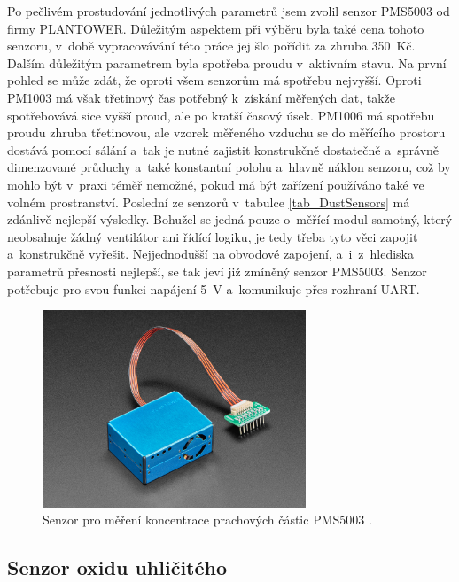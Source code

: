 Po pečlivém prostudování jednotlivých parametrů jsem zvolil senzor PMS5003 od firmy PLANTOWER. Důležitým aspektem při výběru byla také cena tohoto senzoru, v~době vypracovávání této práce jej šlo pořídit za zhruba 350~Kč. Dalším důležitým parametrem byla spotřeba proudu v~aktivním stavu. Na první pohled se může zdát, že oproti všem senzorům má spotřebu nejvyšší. Oproti PM1003 má však třetinový čas potřebný k~získání měřených dat, takže spotřebovává sice vyšší proud, ale po kratší časový úsek. PM1006 má spotřebu proudu zhruba třetinovou, ale vzorek měřeného vzduchu se do měřícího prostoru dostává pomocí sálání a~tak je nutné zajistit konstrukčně dostatečně a~správně dimenzované průduchy a~také konstantní polohu a~hlavně náklon senzoru, což by mohlo být v~praxi téměř nemožné, pokud má být zařízení používáno také ve volném prostranství. Poslední ze senzorů v~tabulce \ref{tab_DustSensors} má zdánlivě nejlepší výsledky. Bohužel se jedná pouze o~měřící modul samotný, který neobsahuje žádný ventilátor ani řídící logiku, je tedy třeba tyto věci zapojit a~konstrukčně vyřešit. Nejjednodušší na obvodové zapojení, a~i~z~hlediska parametrů přesnosti nejlepší, se tak jeví již zmíněný senzor PMS5003. Senzor potřebuje pro svou funkci napájení \SI{5}{\volt} a~komunikuje přes rozhraní UART.

\begin{figure}
    \centering
    \includegraphics[width=0.7\textwidth]{obrazky/PMS5003.jpg}
    \caption[Senzor pro měření koncentrace prachových částic PMS5003.]{Senzor pro měření koncentrace prachových částic PMS5003 \cite{dat_PMS5003}.}
    \label{fig_PMS5003}
\end{figure}

\subsection{Senzor oxidu uhličitého}

